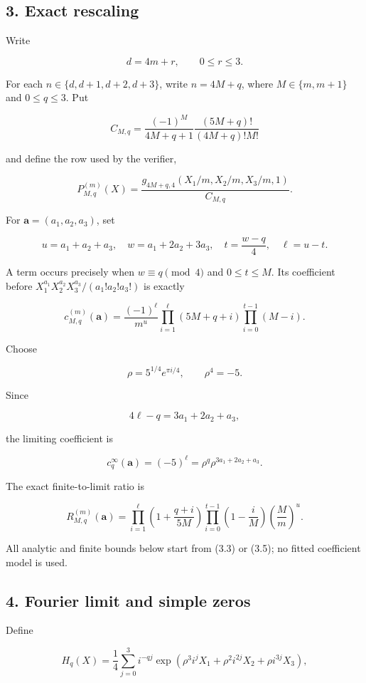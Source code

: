 \documentclass[
  11pt,
  a4paper,
]{article}
\begin{document}
\subsection{3. Exact rescaling}\label{exact-rescaling}

Write

\[
d=4m+r,\qquad 0\le r\le3.
\]

For each \(n\in\{d,d+1,d+2,d+3\}\), write \(n=4M+q\), where
\(M\in\{m,m+1\}\) and \(0\le q\le3\). Put

\[
C_{M,q}=\frac{(-1)^M}{4M+q+1}
\frac{(5M+q)!}{(4M+q)!M!}
\tag{3.1}
\]

and define the row used by the verifier,

\[
P^{(m)}_{M,q}(X)=
\frac{g_{4M+q,4}(X_1/m,X_2/m,X_3/m,1)}{C_{M,q}}.
\tag{3.2}
\]

For \(\mathbf a=(a_1,a_2,a_3)\), set

\[
u=a_1+a_2+a_3,\quad
w=a_1+2a_2+3a_3,\quad
t=\frac{w-q}{4},\quad
\ell=u-t.
\]

A term occurs precisely when \(w\equiv q\pmod4\) and \(0\le t\le M\).
Its coefficient before \(X_1^{a_1}X_2^{a_2}X_3^{a_3}/(a_1!a_2!a_3!)\) is
exactly

\[
c^{(m)}_{M,q}(\mathbf a)=
\frac{(-1)^\ell}{m^u}
\prod_{i=1}^{\ell}(5M+q+i)
\prod_{i=0}^{t-1}(M-i).
\tag{3.3}
\]

Choose

\[
\rho=5^{1/4}e^{\pi i/4},
\qquad \rho^4=-5.
\]

Since

\[
4\ell-q=3a_1+2a_2+a_3,
\]

the limiting coefficient is

\[
c^\infty_q(\mathbf a)=(-5)^\ell=\rho^q
\rho^{3a_1+2a_2+a_3}.
\tag{3.4}
\]

The exact finite-to-limit ratio is

\[
R^{(m)}_{M,q}(\mathbf a)=
\prod_{i=1}^{\ell}\left(1+\frac{q+i}{5M}\right)
\prod_{i=0}^{t-1}\left(1-\frac{i}{M}\right)
\left(\frac Mm\right)^u.
\tag{3.5}
\]

All analytic and finite bounds below start from (3.3) or (3.5); no
fitted coefficient model is used.

\subsection{4. Fourier limit and simple
zeros}\label{fourier-limit-and-simple-zeros}

Define

\[
H_q(X)=\frac14\sum_{j=0}^3 i^{-qj}
\exp\!\left(\rho^3i^jX_1+\rho^2i^{2j}X_2+\rho i^{3j}X_3\right),
\tag{4.1}
\]
\end{document}
